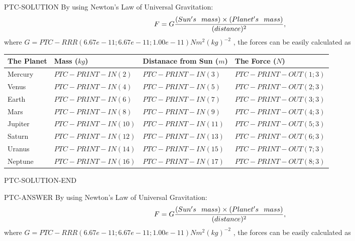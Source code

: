 \documentclass[12pt]{article}
\begin{document}
PTC-SOLUTION
By using Newton's Law of Universal Gravitation:
\[
  F=G \frac{(Sun's \hspace{0.1in} mass) \times (Planet's \hspace{0.1in} mass)} { (distance)^2},
\]
where
$ G=PTC-RRR(6.67e-11; 6.67e-11; 1.00e-11)N m^{2}(kg)^{-2}$ , the forces can be easily calculated as

\vspace{0.2in}


 \begin{tabular}{|l|l|l|l|}
 \hline
        The Planet & Mass ($kg$) & Distanace from Sun ($m$) & The Force ($N$)\\
 \hline
         Mercury  &
           $PTC-PRINT-IN( 2 ) $   &
             $PTC-PRINT-IN(  3) $    & $PTC-PRINT-OUT (1;  3) $
              \\  \hline
         Venus    &
           $ PTC-PRINT-IN( 4 )  $     &
             $PTC-PRINT-IN( 5 ) $    & $PTC-PRINT-OUT (2;  3) $
               \\  \hline
         Earth    &
           $ PTC-PRINT-IN( 6 )  $     &
             $PTC-PRINT-IN( 7 ) $    & $PTC-PRINT-OUT (3;  3) $
              \\   \hline
         Mars     &
           $ PTC-PRINT-IN( 8  ) $     &
             $PTC-PRINT-IN( 9 ) $    & $PTC-PRINT-OUT (4;  3) $
               \\   \hline
         Jupiter  &
           $ PTC-PRINT-IN( 10  ) $    &
             $PTC-PRINT-IN( 11 ) $    & $PTC-PRINT-OUT (5;  3) $
               \\  \hline
         Saturn   &
           $ PTC-PRINT-IN( 12  ) $    &
             $PTC-PRINT-IN( 13)  $    & $PTC-PRINT-OUT (6;  3) $
               \\  \hline
         Uranus   &
           $ PTC-PRINT-IN( 14  ) $    &
             $PTC-PRINT-IN( 15 ) $    & $PTC-PRINT-OUT (7;  3) $
               \\  \hline
         Neptune  &
           $ PTC-PRINT-IN( 16  ) $    &
             $PTC-PRINT-IN( 17 ) $    & $PTC-PRINT-OUT (8;  3) $
               \\  \hline

 \end{tabular}


PTC-SOLUTION-END


PTC-ANSWER
By using Newton's Law of Universal Gravitation:
\[
  F=G \frac{(Sun's \hspace{0.1in} mass) \times (Planet's \hspace{0.1in} mass)} { (distance)^2},
\]
where
$ G=PTC-RRR (6.67e-11 ;6.67e-11 ;1.00e-11) N m^{2}(kg)^{-2}$ , the forces can be easily calculated as
\end{document}
